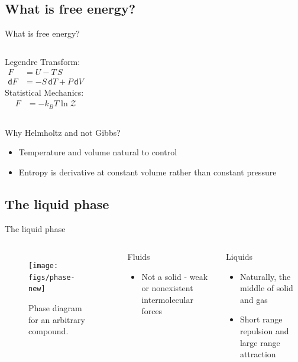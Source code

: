 \documentclass{beamer}
\newcommand*{\diff}{\mathsf{d}}
\begin{document}
\subsection*{What is free energy?}
\begin{frame}{What is free energy?}
		\begin{columns}[t]
		Legendre Transform: 
		\begin{align*}
	 		F &= U - T\,S\\
			\diff F &= - S\, \diff T + P\, \diff V
		\end{align*}
		Statistical Mechanics: 
		\begin{align*}
			F &= - k_B T \ln \mathcal Z
		\end{align*}
		\end{columns}		
	\vspace{2em}Why Helmholtz and not Gibbs?
	\begin{itemize}
		\item Temperature and volume natural to control 
		\item Entropy is derivative at constant volume rather than constant pressure
	\end{itemize}
	\end{frame}

\subsection*{The liquid phase}
\begin{frame}{The liquid phase}
	\begin{columns}[T]
		\begin{figure}
			\texttt{[image: figs/phase-new]}
			\caption{Phase diagram for an arbitrary compound.}
		\end{figure}
		\begin{block}{Fluids}
			\begin{itemize}
				\item Not a solid - weak or nonexistent intermolecular forces
			\end{itemize}
		\end{block}
		\begin{block}{Liquids}
			\begin{itemize}
				\item Naturally, the middle of solid and gas
				\item Short range repulsion and large range attraction 
			\end{itemize}
		\end{block}
	\end{columns}
	
\end{frame}
\end{document}
